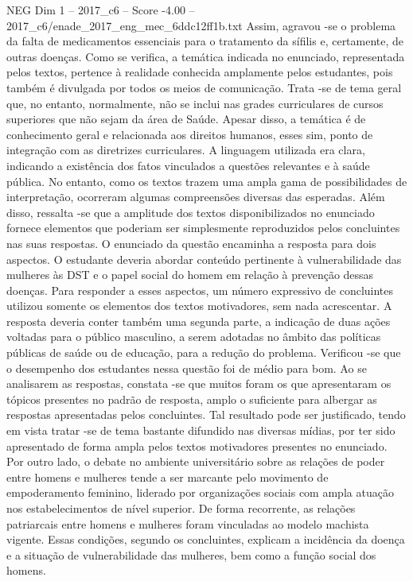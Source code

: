 \begin{textsample}{NEG Dim 1 – 2017\_c6 – Score -4.00 – 2017\_c6/enade\_2017\_eng\_mec\_6ddc12ff1b.txt}
Assim, agravou -se o problema da falta de medicamentos essenciais para o tratamento da sífilis e, certamente, de outras doenças.
Como se verifica, a temática indicada no enunciado, representada pelos textos, pertence à realidade conhecida amplamente pelos estudantes, pois também é divulgada por todos os meios de comunicação.
Trata -se de tema geral que, no entanto, normalmente, não se inclui nas grades curriculares de cursos superiores que não sejam da área de Saúde.
Apesar disso, a temática é de conhecimento geral e relacionada aos direitos humanos, esses sim, ponto de integração com as diretrizes curriculares.
A linguagem utilizada era clara, indicando a existência dos fatos vinculados a questões relevantes e à saúde pública.
No entanto, como os textos trazem uma ampla gama de possibilidades de interpretação, ocorreram algumas compreensões diversas das esperadas.
Além disso, ressalta -se que a amplitude dos textos disponibilizados no enunciado fornece elementos que poderiam ser simplesmente reproduzidos pelos concluintes nas suas respostas.
O enunciado da questão encaminha a resposta para dois aspectos.
O estudante deveria abordar conteúdo pertinente à vulnerabilidade das mulheres às DST e o papel social do homem em relação à prevenção dessas doenças.
Para responder a esses aspectos, um número expressivo de concluintes utilizou somente os elementos dos textos motivadores, sem nada acrescentar.
A resposta deveria conter também uma segunda parte, a indicação de duas ações voltadas para o público masculino, a serem adotadas no âmbito das políticas públicas de saúde ou de educação, para a redução do problema.
Verificou -se que o desempenho dos estudantes nessa questão foi de médio para bom.
Ao se analisarem as respostas, constata -se que muitos foram os que apresentaram os tópicos presentes no padrão de resposta, amplo o suficiente para albergar as respostas apresentadas pelos concluintes.
Tal resultado pode ser justificado, tendo em vista tratar -se de tema bastante difundido nas diversas mídias, por ter sido apresentado de forma ampla pelos textos motivadores presentes no enunciado.
Por outro lado, o debate no ambiente universitário sobre as relações de poder entre homens e mulheres tende a ser marcante pelo movimento de empoderamento feminino, liderado por organizações sociais com ampla atuação nos estabelecimentos de nível superior.
De forma recorrente, as relações patriarcais entre homens e mulheres foram vinculadas ao modelo machista vigente.
Essas condições, segundo os concluintes, explicam a incidência da doença e a situação de vulnerabilidade das mulheres, bem como a função social dos homens.

\end{textsample}
